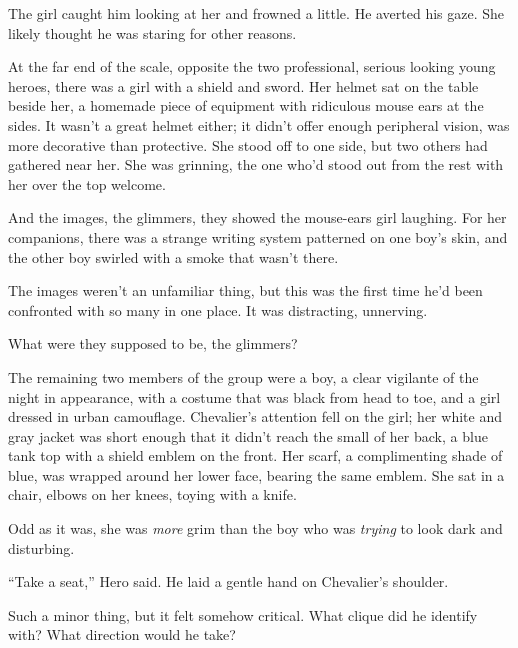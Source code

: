 The girl caught him looking at her and frowned a little.  He averted his gaze.  She likely thought he was staring for other reasons.



At the far end of the scale, opposite the two professional, serious looking young heroes, there was a girl with a shield and sword.  Her helmet sat on the table beside her, a homemade piece of equipment with ridiculous mouse ears at the sides.  It wasn't a great helmet either; it didn't offer enough peripheral vision, was more decorative than protective.  She stood off to one side, but two others had gathered near her.  She was grinning, the one who'd stood out from the rest with her over the top welcome.



And the images, the glimmers, they showed the mouse-ears girl laughing.  For her companions, there was a strange writing system patterned on one boy's skin, and the other boy swirled with a smoke that wasn't there.



The images weren't an unfamiliar thing, but this was the first time he'd been confronted with so many in one place.  It was distracting, unnerving.



What were they supposed to be, the glimmers?



The remaining two members of the group were a boy, a clear vigilante of the night in appearance, with a costume that was black from head to toe, and a girl dressed in urban camouflage.  Chevalier's attention fell on the girl; her white and gray jacket was short enough that it didn't reach the small of her back, a blue tank top with a shield emblem on the front.  Her scarf, a complimenting shade of blue, was wrapped around her lower face, bearing the same emblem.  She sat in a chair, elbows on her knees, toying with a knife.



Odd as it was, she was \emph{more} grim than the boy who was \emph{trying} to look dark and disturbing.



``Take a seat,'' Hero said.  He laid a gentle hand on Chevalier's shoulder.



Such a minor thing, but it felt somehow critical.  What clique did he identify with?  What direction would he take?



